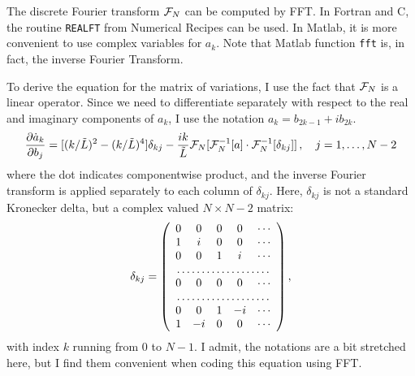 The discrete Fourier transform ${\cal F}_N$ can be computed by FFT.
In Fortran and C, the routine {\tt REALFT} from Numerical Recipes
can be used.  In Matlab, it is more convenient to use complex
variables for $a_k$.  Note that Matlab function {\tt fft} is, in
fact, the inverse Fourier Transform.

To derive the equation for the matrix of variations, I use the fact
that ${\cal F}_N$ is a linear operator.  Since we need to
differentiate separately with respect to the real and imaginary
components of $a_k$, I use the notation $a_k = b_{2k-1} + ib_{2k}$.
\begin{equation}
  \frac{\partial \dot{a}_k}{\partial b_j} =
  [(k/\tilde{L})^2-(k/\tilde{L})^4]\delta_{kj} -
  \frac{ik}{\tilde{L}}{\cal F}_N[{\cal F}_N^{-1}[a]\cdot{\cal
  F}_N^{-1}[\delta_{kj}]]\,,\quad j = 1,\ldots,N-2
\end{equation}
where the dot indicates componentwise product, and the inverse
Fourier transform is applied separately to each column of
$\delta_{kj}$. Here, $\delta_{kj}$ is not a standard Kronecker
delta, but a complex valued $N\times N-2$ matrix:
\begin{equation}
  \delta_{kj} = \left(
  \begin{array}{ccccc}
  0 &  0 & 0 &  0 &\cdots\\
  1 &  i & 0 &  0 &\cdots\\
  0 &  0 & 1 &  i &\cdots\\
\multicolumn{5}{c}\dotfill \\
  0 &  0 & 0 &  0 &\cdots\\
\multicolumn{5}{c}\dotfill \\
  0 &  0 & 1 & -i &\cdots\\
  1 & -i & 0 &  0 &\cdots\\
  \end{array}  \right),
\end{equation}
with index $k$ running from 0 to $N-1$.  I admit, the notations are
a bit stretched here, but I find them convenient when coding this
equation using FFT.


